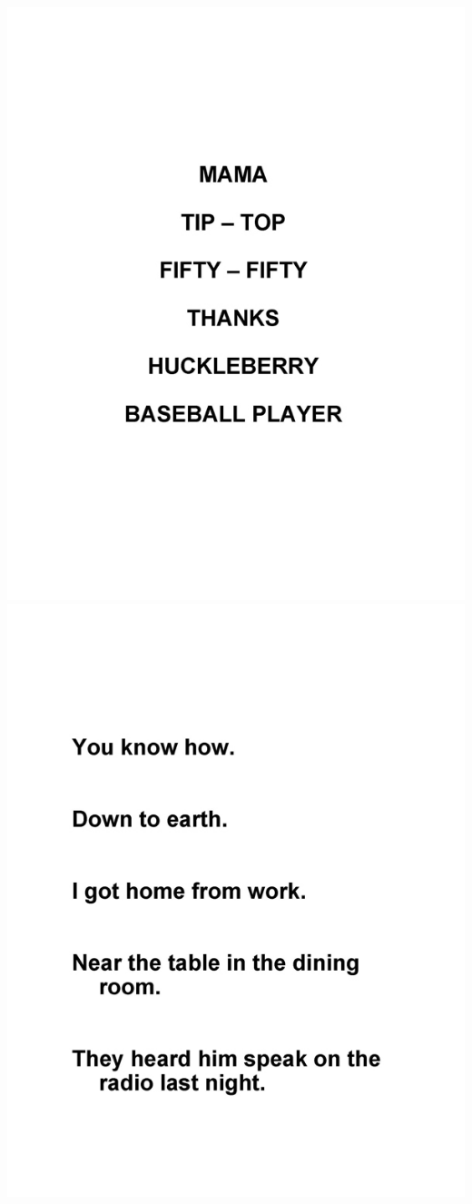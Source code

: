 \documentclass[8pt]{extarticle}
\begin{document}
\newpage
\includegraphics[width=\textwidth]{nihss_4.jpg}
\includegraphics[width=\textwidth]{nihss_2.jpg}
\end{document}
